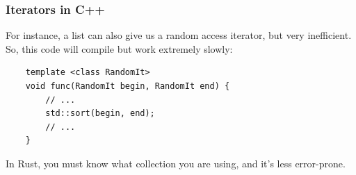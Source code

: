 \documentclass[aspectratio=1610,t]{beamer}
\begin{document}
\begin{frame}[fragile]
\frametitle{Iterators in C++}
For instance, a list can also give us a random access iterator, but very inefficient. So, this code will compile but work extremely slowly:

\begin{verbatim}
    template <class RandomIt>
    void func(RandomIt begin, RandomIt end) {
        // ...
        std::sort(begin, end);
        // ...
    }
\end{verbatim}

In Rust, you must know what collection you are using, and it's less error-prone.
\end{frame}

\end{document}

